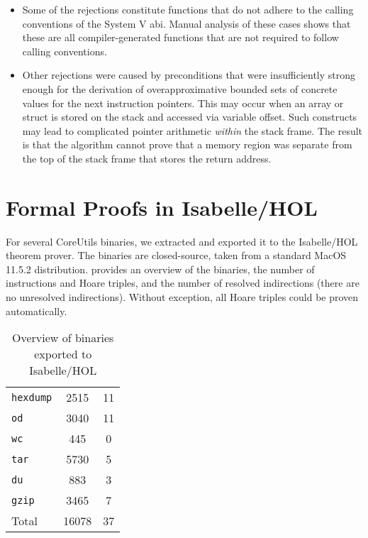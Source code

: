 \begin{itemize}
  \item Some of the rejections constitute functions that do not adhere to the calling conventions of the System V \ac{abi}.
  Manual analysis of these cases shows that these are all compiler-generated functions that are not required to follow calling conventions.
  \item Other rejections were caused by preconditions that were insufficiently strong enough for the derivation of overapproximative bounded sets of concrete values for the next instruction pointers.
  This may occur when an array or struct is stored on the stack and accessed via variable offset.
  Such constructs may lead to complicated pointer arithmetic \emph{within} the stack frame.
  The result is that the algorithm cannot prove that a memory region was separate from the top of the stack frame that stores the return address.
\end{itemize}

\section{Formal Proofs in Isabelle/HOL}\label{sec:not-me-proofs}
For several CoreUtils binaries, we extracted  and exported it to the Isabelle/HOL theorem prover.
The binaries are closed-source, taken from a standard MacOS 11.5.2 distribution.
 provides an overview of the binaries, the number of instructions and Hoare triples, and the number of resolved indirections (there are no unresolved indirections).
Without exception, all Hoare triples could be proven automatically.

\begin{table}
  \centering
  \caption{Overview of binaries exported to Isabelle/HOL}
  \label{tab:isa}
  \begin{tabular}{lSS}
    \toprule
     & {} & {}\\
    \midrule
    \texttt{hexdump} & 2515 & 11 \\
    \texttt{od}      & 3040 & 11 \\
    \texttt{wc}      &  445 &  0 \\
    \texttt{tar}     & 5730 & 5 \\
    \texttt{du}      &  883 & 3\\
    \texttt{gzip}    & 3465 & 7\\
    \midrule
    Total            & 16078 & 37 \\
    \bottomrule
  \end{tabular}
\end{table}

